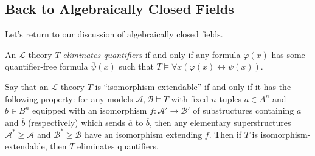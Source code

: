 \documentclass[../notes.tex]{subfiles}
\begin{document}
\subsection{Back to Algebraically Closed Fields}
Let's return to our discussion of algebraically closed fields.
\begin{definition}
	An $\mathcal L$-theory $T$ \textit{eliminates quantifiers} if and only if any formula $\varphi(\overline x)$ has some quantifier-free formula $\overline\psi(\overline x)$ such that $T\models\forall x(\varphi(\overline x)\leftrightarrow\psi(\overline x))$.
\end{definition}
\begin{theorem}
	Say that an $\mathcal L$-theory $T$ is ``isomorphism-extendable'' if and only if it has the following property: for any models $\mathcal A,\mathcal B\models T$ with fixed $n$-tuples $a\in A^n$ and $b\in B^n$ equipped with an isomorphism $f\colon\mathcal A'\to\mathcal B'$ of substructures containing $\overline a$ and $\overline b$ (respectively) which sends $\overline a$ to $\overline b$, then any elementary superstructures $\mathcal A^*\ge\mathcal A$ and $\mathcal B^*\ge\mathcal B$ have an isomorphism extending $f$. Then if $T$ is isomorphism-extendable, then $T$ eliminates quantifiers.
\end{theorem}
\end{document}
